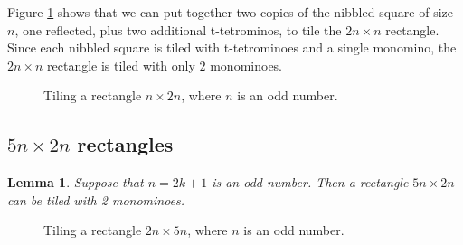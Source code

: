 \documentclass{article}
\theoremstyle{plain}
\newtheorem{lemma}[theorem]{Lemma}
\begin{document}
Figure \ref{n_times_2n} shows that we can put together two copies of the nibbled square of size $n$, one reflected, plus two additional t-tetrominos, to tile the $2n \times n$ rectangle.
Since each nibbled square is tiled with t-tetrominoes and a single monomino, the $2n \times n$ rectangle is tiled with only $2$ monominoes.

\begin{figure}

\caption{Tiling a rectangle $n \times 2n$, where $n$ is an odd number.}
\label{n_times_2n}
\end{figure}


\subsection{$5n \times 2n$ rectangles}

\begin{lemma}\label{5_times_2}  
Suppose that $n = 2k+1$ is an odd number. Then a rectangle $5n \times 2n$ can be tiled with 2 monominoes.  
\end{lemma}

\begin{figure}

\caption{Tiling a rectangle $2n \times 5n$, where $n$ is an odd number.}
\label{2n_times_5n}
\end{figure}

{}

\end{document}
